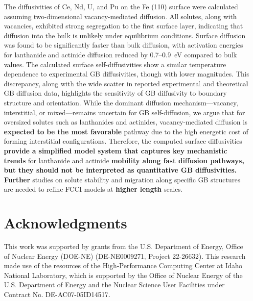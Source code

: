 \documentclass[preprint,12pt]{elsarticle}
\providecommand{\DIFaddtex}[1]{{\bf #1}} %
\providecommand{\DIFdeltex}[1]{} %
\providecommand{\DIFaddbegin}{\protect\color{blue}} %
\providecommand{\DIFaddend}{\protect\color{black}} %
\providecommand{\DIFdelbegin}{\protect\color{red}} %
\providecommand{\DIFdelend}{\protect\color{black}} %
\providecommand{\DIFadd}[1]{\texorpdfstring{\DIFaddtex{#1}}{#1}} %
\providecommand{\DIFdel}[1]{\texorpdfstring{\DIFdeltex{#1}}{}} %
\newcommand{\DIFscaledelfig}{0.5}
\newlength{\DIFdelgraphicswidth} %
\newlength{\DIFdelgraphicsheight} %
\newcommand{\DIFaddincludegraphics}[2][]{{\color{blue}\fbox{\DIFOincludegraphics[#1]{#2}}}} %
\newcommand{\DIFdelincludegraphics}[2][]{%
\sbox{\DIFdelgraphicsbox}{\DIFOincludegraphics[#1]{#2}}%
\settoboxwidth{\DIFdelgraphicswidth}{\DIFdelgraphicsbox} %
\settoboxtotalheight{\DIFdelgraphicsheight}{\DIFdelgraphicsbox} %
\scalebox{\DIFscaledelfig}{%
\parbox[b]{\DIFdelgraphicswidth}{\usebox{\DIFdelgraphicsbox}\\[-\baselineskip] \rule{\DIFdelgraphicswidth}{0em}}\llap{\resizebox{\DIFdelgraphicswidth}{\DIFdelgraphicsheight}{%
\setlength{\unitlength}{\DIFdelgraphicswidth}%
\begin{picture}(1,1)%
\thicklines\linethickness{2pt} %
{\color[rgb]{1,0,0}\put(0,0){\framebox(1,1){}}}%
{\color[rgb]{1,0,0}\put(0,0){\line( 1,1){1}}}%
{\color[rgb]{1,0,0}\put(0,1){\line(1,-1){1}}}%
\end{picture}%
}\hspace*{3pt}}} %
} %
\DeclareRobustCommand{\DIFaddbegin}{\DIFOaddbegin \let\includegraphics\DIFaddincludegraphics} %
\DeclareRobustCommand{\DIFaddend}{\DIFOaddend \let\includegraphics\DIFOincludegraphics} %
\DeclareRobustCommand{\DIFdelbegin}{\DIFOdelbegin \let\includegraphics\DIFdelincludegraphics} %
\DeclareRobustCommand{\DIFdelend}{\DIFOaddend \let\includegraphics\DIFOincludegraphics} %
\begin{document}
The diffusivities of Ce, Nd, U, and Pu on the Fe (110) surface were calculated assuming two-dimensional vacancy-mediated diffusion. All solutes, along with vacancies, exhibited strong segregation to the first surface layer, indicating that diffusion into the bulk is unlikely under equilibrium conditions. 
Surface diffusion was found to be significantly faster than bulk diffusion, with activation energies for lanthanide and actinide diffusion reduced by 0.7–0.9~eV compared to bulk values. The calculated surface self-diffusivities show a similar temperature dependence to experimental GB diffusivities, though with lower magnitudes. This discrepancy, along with the wide scatter in reported experimental and theoretical GB diffusion data, highlights the sensitivity of GB diffusivity to boundary structure and orientation. 
While the dominant diffusion mechanism—vacancy, interstitial, or mixed—remains uncertain for GB self-diffusion, we argue that for oversized solutes such as lanthanides and actinides, vacancy-mediated diffusion is \DIFdelbegin \DIFdel{the most plausible }\DIFdelend \DIFaddbegin \DIFadd{expected to be the most favorable }\DIFaddend pathway due to the high energetic cost of forming interstitial configurations. 
Therefore, \DIFdelbegin \DIFdel{we propose that }\DIFdelend the computed surface diffusivities \DIFdelbegin \DIFdel{can serve as reasonable approximations }\DIFdelend \DIFaddbegin \DIFadd{provide a simplified model system that captures key mechanistic trends }\DIFaddend for lanthanide and actinide \DIFdelbegin \DIFdel{diffusion along GBs in Fe-based cladding materials. However, further }\DIFdelend \DIFaddbegin \DIFadd{mobility along fast diffusion pathways, but they should not be interpreted as quantitative GB diffusivities. Further }\DIFaddend studies on solute stability and migration along specific GB structures are needed to refine FCCI models at \DIFdelbegin \DIFdel{higher-length }\DIFdelend \DIFaddbegin \DIFadd{higher length }\DIFaddend scales.

\section{Acknowledgments}

This work was supported by grants from the U.S. Department of Energy, Office of Nuclear Energy (DOE-NE) (DE-NE0009271, Project 22-26632). This research made use of the resources of the High-Performance Computing Center at Idaho National Laboratory, which is supported by the Office of Nuclear Energy of the U.S. Department of Energy and the Nuclear Science User Facilities under Contract No. DE-AC07-05ID14517.



\FloatBarrier
 

\end{document}
